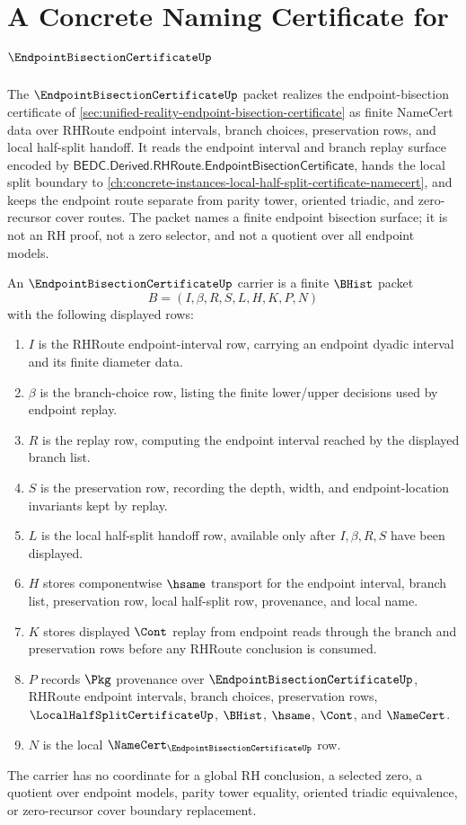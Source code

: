 \chapter{A Concrete Naming Certificate for $\EndpointBisectionCertificateUp$}
\label{ch:concrete-instances-endpoint-bisection-certificate-namecert}

The $\EndpointBisectionCertificateUp$ packet realizes the endpoint-bisection certificate of \autoref{sec:unified-reality-endpoint-bisection-certificate} as finite NameCert data over RHRoute endpoint intervals, branch choices, preservation rows, and local half-split handoff. It reads the endpoint interval and branch replay surface encoded by $\mathsf{BEDC.Derived.RHRoute.EndpointBisectionCertificate}$, hands the local split boundary to \autoref{ch:concrete-instances-local-half-split-certificate-namecert}, and keeps the endpoint route separate from parity tower, oriented triadic, and zero-recursor cover routes. The packet names a finite endpoint bisection surface; it is not an RH proof, not a zero selector, and not a quotient over all endpoint models.

\begin{definition}
\label{def:endpoint-bisection-certificate-carrier}
An $\EndpointBisectionCertificateUp$ carrier is a finite $\BHist$ packet
$$
B=(I,\beta,R,S,L,H,K,P,N)
$$
with the following displayed rows:
\begin{enumerate}
\item $I$ is the RHRoute endpoint-interval row, carrying an endpoint dyadic interval and its finite diameter data.
\item $\beta$ is the branch-choice row, listing the finite lower/upper decisions used by endpoint replay.
\item $R$ is the replay row, computing the endpoint interval reached by the displayed branch list.
\item $S$ is the preservation row, recording the depth, width, and endpoint-location invariants kept by replay.
\item $L$ is the local half-split handoff row, available only after $I,\beta,R,S$ have been displayed.
\item $H$ stores componentwise $\hsame$ transport for the endpoint interval, branch list, preservation row, local half-split row, provenance, and local name.
\item $K$ stores displayed $\Cont$ replay from endpoint reads through the branch and preservation rows before any RHRoute conclusion is consumed.
\item $P$ records $\Pkg$ provenance over $\EndpointBisectionCertificateUp$, RHRoute endpoint intervals, branch choices, preservation rows, $\LocalHalfSplitCertificateUp$, $\BHist$, $\hsame$, $\Cont$, and $\NameCert$.
\item $N$ is the local $\NameCert_{\EndpointBisectionCertificateUp}$ row.
\end{enumerate}
The carrier has no coordinate for a global RH conclusion, a selected zero, a quotient over endpoint models, parity tower equality, oriented triadic equivalence, or zero-recursor cover boundary replacement.
\end{definition}

